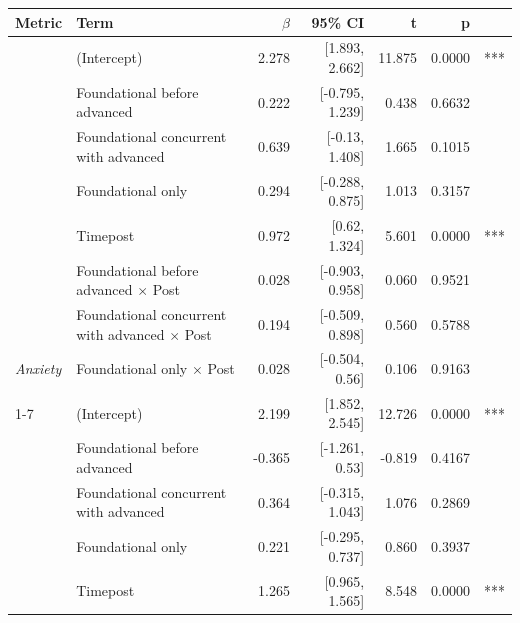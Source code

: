 \begin{table}[!h]
\centering
\begin{threeparttable}
\begin{tabular}[t]{>{}llrrrrl}
\toprule
\textbf{Metric} & \textbf{Term} & \textbf{$\beta$} & \textbf{95\% CI} & \textbf{t} & \textbf{p} & \textbf{}\\
\midrule
 & (Intercept) & 2.278 & {}[1.893, 2.662] & 11.875 & 0.0000 & \vphantom{1} ***\\

 & Foundational before advanced & 0.222 & {}[-0.795, 1.239] & 0.438 & 0.6632 \vphantom{1} & \\

 & Foundational concurrent with advanced & 0.639 & {}[-0.13, 1.408] & 1.665 & 0.1015 \vphantom{1} & \\

 & Foundational only & 0.294 & {}[-0.288, 0.875] & 1.013 & 0.3157 \vphantom{1} & \\

 & Timepost & 0.972 & {}[0.62, 1.324] & 5.601 & 0.0000 & \vphantom{1} ***\\

 & Foundational before advanced $\times$ Post & 0.028 & {}[-0.903, 0.958] & 0.060 & 0.9521 \vphantom{1} & \\

 & Foundational concurrent with advanced $\times$ Post & 0.194 & {}[-0.509, 0.898] & 0.560 & 0.5788 \vphantom{1} & \\

\multirow[t]{-7}{*}[\normalbaselineskip]{\raggedright\arraybackslash \em{Anxiety}} & Foundational only $\times$ Post & 0.028 & {}[-0.504, 0.56] & 0.106 & 0.9163 \vphantom{1} & \\
\cmidrule{1-7}
 & (Intercept) & 2.199 & {}[1.852, 2.545] & 12.726 & 0.0000 & \vphantom{1} ***\\

 & Foundational before advanced & -0.365 & {}[-1.261, 0.53] & -0.819 & 0.4167 \vphantom{1} & \\

 & Foundational concurrent with advanced & 0.364 & {}[-0.315, 1.043] & 1.076 & 0.2869 \vphantom{1} & \\

 & Foundational only & 0.221 & {}[-0.295, 0.737] & 0.860 & 0.3937 \vphantom{1} & \\

 & Timepost & 1.265 & {}[0.965, 1.565] & 8.548 & 0.0000 & \vphantom{1} ***\\


\end{tabular}
\end{threeparttable}
\end{table}
